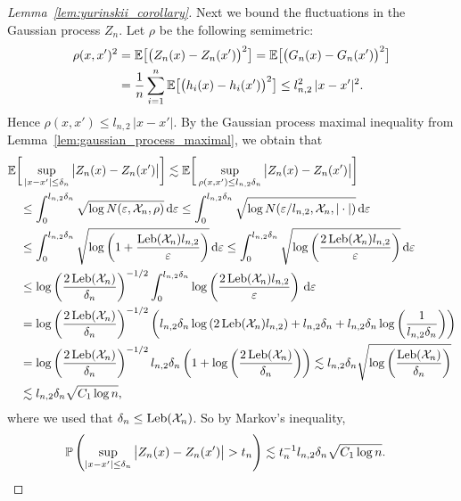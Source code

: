 \begin{proof}[Lemma~\ref{lem:yurinskii_corollary}]
  Next we bound the fluctuations in the Gaussian process
  $Z_n$.
  Let $\rho$ be the following semimetric:
  \begin{align*}
    \rho(x, x')^2
    &=
    \E\big[\big( Z_n(x) - Z_n(x') \big)^2\big]
    =
    \E\big[\big( G_n(x) - G_n(x') \big)^2\big] \\
    &=
    \frac{1}{n}
    \sum_{i=1}^n
    \E\big[\big( h_i(x) - h_i(x') \big)^2\big]
    \leq
    l_{n,2}^2 \, |x - x'|^2.
  \end{align*}
  Hence
  $\rho(x, x')
  \leq
  l_{n,2} \, |x - x'|$.
  By
  the Gaussian process maximal inequality from
  Lemma~\ref{lem:gaussian_process_maximal},
  we obtain that
  \begin{align*}
    &\E\bigg[
      \sup_{|x - x'| \leq \delta_n}
      \big|
      Z_n(x) - Z_n(x')
      \big|
    \bigg]
    \lesssim
    \E\bigg[
      \sup_{\rho(x,x') \leq l_{n,2} \delta_n}
      \big|
      Z_n(x) - Z_n(x')
      \big|
    \bigg] \\
    &\quad\leq
    \int_0^{l_{n,2} \delta_n}
    \sqrt{\log N(\varepsilon, \cX_n, \rho)}
    \diff{\varepsilon}
    \leq
    \int_0^{l_{n,2} \delta_n}
    \sqrt{\log N(\varepsilon / l_{n,2}, \cX_n, |\cdot|)}
    \diff{\varepsilon} \\
    &\quad\leq
    \int_0^{l_{n,2} \delta_n}
    \sqrt{\log \left( 1 + \frac{\Leb(\cX_n) l_{n,2}}{\varepsilon} \right)}
    \diff{\varepsilon}
    \leq
    \int_0^{l_{n,2} \delta_n}
    \sqrt{\log \left( \frac{2\Leb(\cX_n) l_{n,2}}{\varepsilon} \right)}
    \diff{\varepsilon} \\
    &\quad\leq
    \log \left(\frac{2\Leb(\cX_n)}{\delta_n} \right)^{-1/2}
    \int_0^{l_{n,2} \delta_n}
    \log \left( \frac{2\Leb(\cX_n) l_{n,2}}{\varepsilon} \right)
    \diff{\varepsilon} \\
    &\quad=
    \log \left(\frac{2\Leb(\cX_n)}{\delta_n} \right)^{-1/2}
    \left(
      l_{n,2} \delta_n \log \left( 2 \Leb(\cX_n) l_{n,2} \right)
      + l_{n,2} \delta_n
      + l_{n,2} \delta_n \log \left( \frac{1}{l_{n,2} \delta_n} \right)
    \right) \\
    &\quad=
    \log \left(\frac{2\Leb(\cX_n)}{\delta_n} \right)^{-1/2}
    l_{n,2} \delta_n
    \left(
      1 +
      \log \left( \frac{2\Leb(\cX_n)}{\delta_n} \right)
    \right)
    \lesssim
    l_{n,2} \delta_n
    \sqrt{\log \left( \frac{\Leb(\cX_n)}{\delta_n} \right)} \\
    &\quad\lesssim
    l_{n,2} \delta_n
    \sqrt{C_1 \log n},
  \end{align*}
  where we used that $\delta_n \leq \Leb(\cX_n)$.
  So by Markov's inequality,
  \begin{align*}
    \P\left(
      \sup_{|x - x'| \leq \delta_n}
      \big|
      Z_n(x) - Z_n(x')
      \big|
      > t_n
    \right)
    &\lesssim
    t_n^{-1}
    l_{n,2} \delta_n
    \sqrt{C_1 \log n}.
  \end{align*}


\end{proof}
